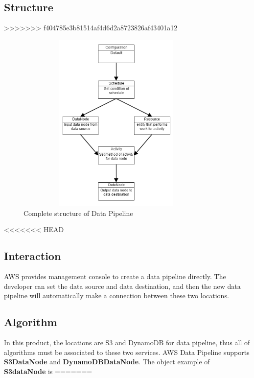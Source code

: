 	\subsection{Structure}
>>>>>>> f404785e3b81514af4d6d2a8723826af43401a12
    \begin{figure}[h]
        \includegraphics[width=10cm, height=9cm]{data_pipeline.png}
        \centering
        \caption{Complete structure of Data Pipeline}
    \end{figure}
    
<<<<<<< HEAD
	\subsection{Interaction}
	AWS provides management console to create a data pipeline directly. The developer can set the data source and data destination, and then the new data pipeline will automatically make  a connection between these two locations.  
    
\subsection{ Algorithm}
	In this product, the locations are S3 and DynamoDB for data pipeline, thus all of algorithms must be associated to these two services. AWS Data Pipeline supports \textbf{S3DataNode} and \textbf{DynamoDBDataNode}. The  object example of \textbf{S3dataNode} is
=======
